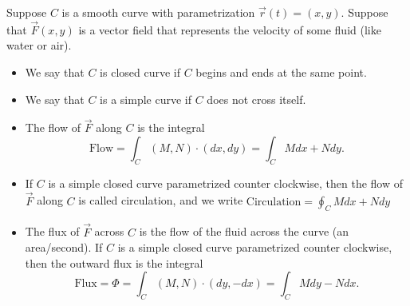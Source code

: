 \begin{definition}
%
 Suppose $C$ is a smooth curve with parametrization $\vec r(t)=(x,y)$.  Suppose that $\vec F(x,y)$ is a vector field that represents the velocity of some fluid (like water or air).  
\begin{itemize}
 \item We say that $C$ is closed curve if $C$ begins and ends at the same point.
 \item We say that $C$ is a simple curve if $C$ does not cross itself. 
 \item The flow of $\vec F$ along $C$ is the integral $$\text{Flow} = \int_C (M,N)\cdot (dx,dy) = \int_C Mdx+Ndy.$$
 \item If $C$ is a simple closed curve parametrized counter clockwise, then the flow of $\vec F$ along $C$ is called circulation, and we write 
$\text{Circulation} = \oint_C Mdx+Ndy$
 \item The flux of $\vec F$ across $C$ is the flow of the fluid across the curve (an area/second). If $C$ is a simple closed curve parametrized counter clockwise, then the outward flux is the integral   
$$\text{Flux} = \Phi = \int_C(M,N)\cdot (dy,-dx) =\int_C Mdy-Ndx .$$
\end{itemize}

\end{definition}

